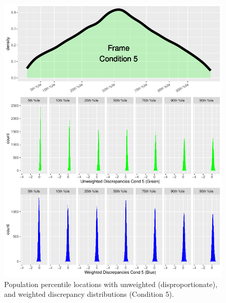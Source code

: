 \documentclass[
  ,man]{apa7}
\begin{document}
\begin{figure}
\centering
\includegraphics{NormsBuilding_files/figure-latex/Figure7-1.pdf}
\caption{\label{fig:Figure7}Population percentile locations with unweighted (disproportionate), and weighted discrepancy distributions (Condition 5).}
\end{figure}
\end{document}
